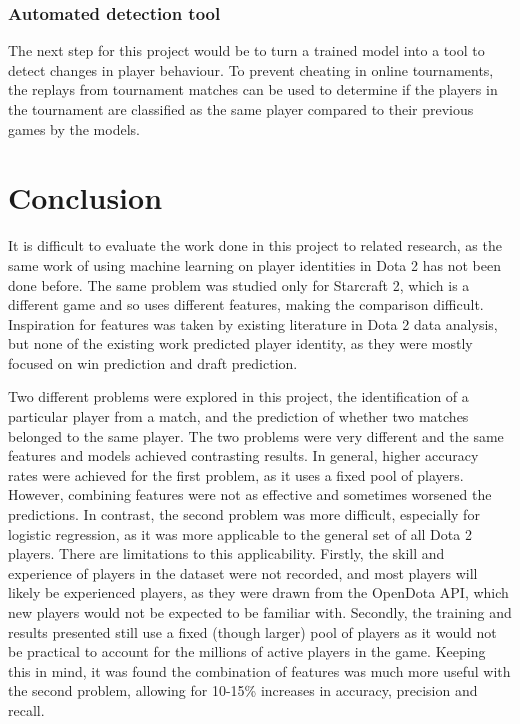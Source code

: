 \documentclass[Report.tex]{subfiles}
\begin{document}
\subsubsection{Automated detection tool}
The next step for this project would be to turn a trained model into a tool to detect changes in player behaviour. To prevent cheating in online tournaments, the replays from tournament matches can be used to determine if the players in the tournament are classified as the same player compared to their previous games by the models. 


\section{Conclusion}
It is difficult to evaluate the work done in this project to related research, as the same work of using machine learning on player identities in Dota 2 has not been done before. The same problem was studied only for Starcraft 2, which is a different game and so uses different features, making the comparison difficult. Inspiration for features was taken by existing literature in Dota 2 data analysis, but none of the existing work predicted player identity, as they were mostly focused on win prediction and draft prediction. 

Two different problems were explored in this project, the identification of a particular player from a match, and the prediction of whether two matches belonged to the same player. The two problems were very different and the same features and models achieved contrasting results. In general, higher accuracy rates were achieved for the first problem, as it uses a fixed pool of players. However, combining features were not as effective and sometimes worsened the predictions. In contrast, the second problem was more difficult, especially for logistic regression, as it was more applicable to the general set of all Dota 2 players. There are limitations to this applicability. Firstly, the skill and experience of players in the dataset were not recorded, and most players will likely be experienced players, as they were drawn from the OpenDota API, which new players would not be expected to be familiar with. Secondly, the training and results presented still use a fixed (though larger) pool of players as it would not be practical to account for the millions of active players in the game. Keeping this in mind, it was found the combination of features was much more useful with the second problem, allowing for 10-15\% increases in accuracy, precision and recall. 
\end{document}
